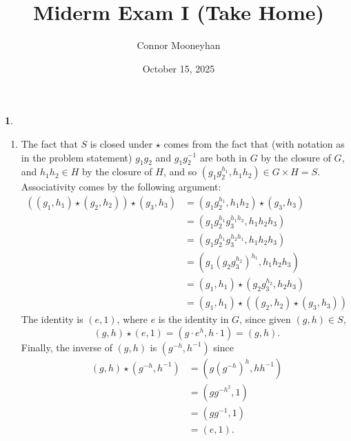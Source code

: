 \documentclass[12pt]{article}
\title{Miderm Exam I (Take Home)}
\author{Connor Mooneyhan}
\date{October 15, 2025}
\theoremstyle{definition}
\newtheorem{ex}{}
\newenvironment{exercise}[1]{
	\renewcommand{\theex}{#1}
	\begin{ex}
		}{\end{ex}}
\begin{document}
\maketitle

\begin{exercise}{6}\
	\begin{enumerate}[label=(\alph*)]
		\item The fact that $S$ is closed under $\star$ comes from the fact that (with notation as in the problem statement) $g_1g_2$ and $g_1g_2^{-1}$ are both in $G$ by the closure of $G$, and $h_1h_2 \in H$ by the closure of $H$, and so $(g_1g_2^{h_1}, h_1h_2) \in G \times H = S$.
		      Associativity comes by the following argument: \begin{align*}
			      \left((g_1, h_1) \star (g_2, h_2)\right) \star (g_3, h_3) & = (g_1g_2^{h_1}, h_1h_2) \star (g_3, h_3)                   \\
			                                                                & = (g_1g_2^{h_1}g_3^{h_1h_2}, h_1h_2h_3)                     \\
			                                                                & = (g_1g_2^{h_1}g_3^{h_2h_1}, h_1h_2h_3)                     \\
			                                                                & = (g_1(g_2g_3^{h_2})^{h_1}, h_1h_2h_3)                      \\
			                                                                & = (g_1, h_1) \star (g_2g_3^{h_2}, h_2h_3)                   \\
			                                                                & = (g_1, h_1) \star \left((g_2, h_2) \star (g_3, h_3)\right)
		      \end{align*}
		      The identity is $(e, 1)$, where $e$ is the identity in $G$, since given $(g, h) \in S$, \begin{equation*}
			      (g, h) \star (e, 1) = (g \cdot e^{h}, h \cdot 1) = (g, h).
		      \end{equation*}
		      Finally, the inverse of $(g, h)$ is $(g^{-h}, h^{-1})$ since \begin{align*}
			      (g, h) \star (g^{-h}, h^{-1}) & = (g(g^{-h})^{h}, hh^{-1}) \\
			                                    & = (gg^{-h^2}, 1)           \\
			                                    & = (gg^{-1}, 1)             \\
			                                    & = (e, 1).

\end{align*}
\end{enumerate}
\end{exercise}
\end{document}
